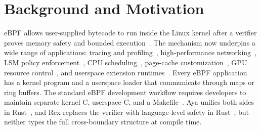 \documentclass[sigplan,10pt,nonacm]{acmart}
\begin{document}
\section{Background and Motivation}
\label{sec:bg}

eBPF allows user-supplied bytecode to run inside the Linux kernel after a verifier proves memory safety and bounded execution~\cite{linux-ebpf,ebpfsurvey}.
The mechanism now underpins a wide range of applications: tracing and profiling~\cite{bpftrace,bcc}, high-performance networking~\cite{xdp}, LSM policy enforcement~\cite{lsm-bpf}, CPU scheduling~\cite{ghost}, page-cache customization~\cite{cacheext}, GPU resource control~\cite{gpuext}, and userspace extension runtimes~\cite{bpftime}.
Every eBPF application has a kernel program and a userspace loader that communicate through maps or ring buffers.
The standard eBPF development workflow requires developers to maintain separate kernel C, userspace C, and a Makefile~\cite{libbpf}.
Aya unifies both sides in Rust~\cite{aya}, and Rex replaces the verifier with language-level safety in Rust~\cite{rex}, but neither types the full cross-boundary structure at compile time.
\end{document}
